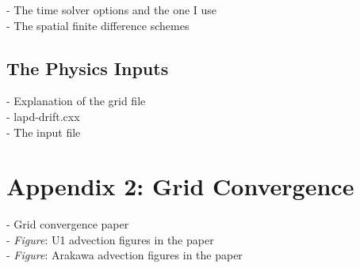\documentclass[12pt]{article}
\begin{document}
- The time solver options and the one I use \\
- The spatial finite difference schemes \\

\subsection{The Physics Inputs}

- Explanation of the grid file \\
- lapd-drift.cxx \\
- The input file \\

\section{Appendix 2: Grid Convergence}

- Grid convergence paper \\
- \emph{Figure}: U1 advection figures in the paper \\
- \emph{Figure}: Arakawa advection figures in the paper \\
\end{document}
